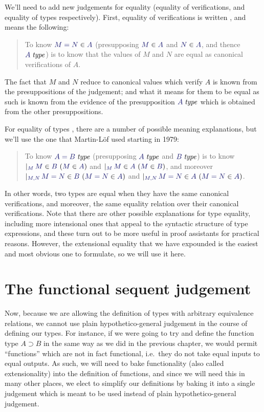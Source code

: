 \documentclass[main.tex]{subfiles}
\begin{document}
We'll need to add new judgements for equality (equality of
verifications, and equality of types respectively). First, equality of
verifications is written , and means the
following:

\begin{quote}
  To know $\ver{M=N}{A}$ (presupposing $\ver{M}{A}$ and $\ver{N}{A}$,
  and thence $\isset{A}$) is to know that the values of $M$ and $N$ are
  equal as canonical verifications of $A$.
\end{quote}

The fact that $M$ and $N$ reduce to canonical values which verify $A$
is known from the presuppositions of the judgement; and what it means
for them to be equal as such is known from the evidence of the
presupposition $\isset{A}$ which is obtained from the other
presuppositions.

For equality of types , there are a number of
possible meaning explanations, but we'll use the one that Martin-L\"of
used starting in 1979:

\begin{quote}
  To know $\isset{A=B}$ (presupposing $\isset{A}$ and $\isset{B}$) is to know
$\genj{M}{\hyp{\ver{M}{B}}{\ver{M}{A}}}$ and
$\genj{M}{\hyp{\ver{M}{A}}{\ver{M}{B}}}$, and moreover
$\genj{M,N}{\hyp{\ver{M=N}{B}}{\ver{M=N}{A}}}$ and
$\genj{M,N}{\hyp{\ver{M=N}{A}}{\ver{M=N}{A}}}$.
\end{quote}

In other words, two types are equal when they have the same canonical
verifications, and moreover, the same equality relation over their canonical
verifications. Note that there are other possible explanations for type
equality, including more intensional ones that appeal to the syntactic
structure of type expressions, and these turn out to be more useful in proof
assistants for practical reasons. However, the extensional equality that we
have expounded is the easiest and most obvious one to formulate, so we will
use it here.

\section{The functional sequent judgement}

Now, because we are allowing the definition of types with arbitrary equivalence
relations, we cannot use plain hypothetico-general judgement in the course of
defining our types. For instance, if we were going to try and define the
function type $A\supset B$ in the same way as we did in the previous chapter,
we would permit ``functions'' which are not in fact functional, i.e.\ they do
not take equal inputs to equal outputs. As such, we will need to bake
functionality (also called extensionality) into the definition of functions,
and since we will need this in many other places, we elect to simplify our
definitions by baking it into a single judgement which is meant to be used
instead of plain hypothetico-general judgement.
\end{document}
